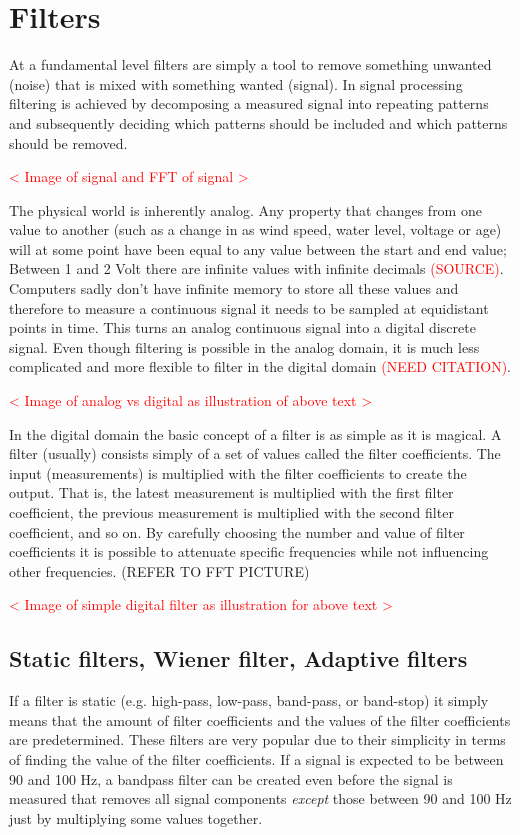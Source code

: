 \section{Filters}
At a fundamental level filters are simply a tool to remove something unwanted (noise) that is mixed with something wanted (signal). In signal processing filtering is achieved by decomposing a measured signal into repeating patterns and subsequently deciding which patterns should be included and which patterns should be removed. 

\textcolor{red}{< Image of signal and FFT of signal >}

The physical world is inherently analog. Any property that changes from one value to another (such as a change in as wind speed, water level, voltage or age) will at some point have been equal to any value between the start and end value; Between 1 and 2 Volt there are infinite values with infinite decimals \textcolor{red}{(SOURCE)}. Computers sadly don't have infinite memory to store all these values and therefore to measure a continuous signal it needs to be sampled at equidistant points in time. This turns an analog continuous signal into a digital discrete signal. Even though filtering is possible in the analog domain, it is much less complicated and more flexible to filter in the digital domain \textcolor{red}{(NEED CITATION)}.

\textcolor{red}{< Image of analog vs digital as illustration of above text >}

In the digital domain the basic concept of a filter is as simple as it is magical. A filter (usually) consists simply of a set of values called the filter coefficients. The input (measurements) is multiplied with the filter coefficients to create the output. That is, the latest measurement is multiplied with the first filter coefficient, the previous measurement is multiplied with the second filter coefficient, and so on. By carefully choosing the number and value of filter coefficients it is possible to attenuate specific frequencies while not influencing other frequencies. (REFER TO FFT PICTURE)

\textcolor{red}{< Image of simple digital filter as illustration for above text >}

\subsection{Static filters, Wiener filter, Adaptive filters}
If a filter is static (e.g. high-pass, low-pass, band-pass, or band-stop) it simply means that the amount of filter coefficients and the values of the filter coefficients are predetermined. These filters are very popular due to their simplicity in terms of finding the value of the filter coefficients. If a signal is expected to be between 90 and 100 Hz, a bandpass filter can be created even before the signal is measured that removes all signal components \textit{except} those between 90 and 100 Hz just by multiplying some values together. 


